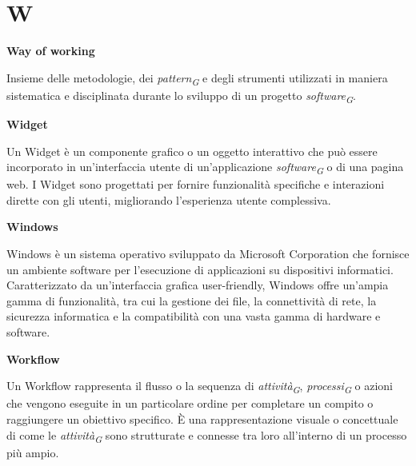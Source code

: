\documentclass{article}
\begin{document}
\pagebreak
\section*{W}
{}

\vspace{0.4cm}

\textbf{Way of working}

\vspace{0.1cm}

Insieme delle metodologie, dei \textit{pattern}\textsubscript{\textit{G}} e degli strumenti utilizzati in maniera sistematica e disciplinata durante lo sviluppo di un progetto \textit{software}\textsubscript{\textit{G}}.

\vspace{0.4cm}

\textbf{Widget}

\vspace{0.1cm}

Un Widget è un componente grafico o un oggetto interattivo che può essere incorporato in un'interfaccia utente di un'applicazione \textit{software}\textsubscript{\textit{G}} o di una pagina web. I Widget sono progettati per fornire funzionalità specifiche e interazioni dirette con gli utenti, migliorando l'esperienza utente complessiva.

\vspace{0.4cm}

\textbf{Windows}

\vspace{0.1cm}

Windows è un sistema operativo sviluppato da Microsoft Corporation che fornisce un ambiente software per l'esecuzione di applicazioni su dispositivi informatici. Caratterizzato da un'interfaccia grafica user-friendly, Windows offre un'ampia gamma di funzionalità, tra cui la gestione dei file, la connettività di rete, la sicurezza informatica e la compatibilità con una vasta gamma di hardware e software.

\vspace{0.4cm}

\textbf{Workflow}

\vspace{0.1cm}

Un Workflow rappresenta il flusso o la sequenza di \textit{attività}\textsubscript{\textit{G}}, \textit{processi}\textsubscript{\textit{G}} o azioni che vengono eseguite in un particolare ordine per completare un compito o raggiungere un obiettivo specifico. È una rappresentazione visuale o concettuale di come le \textit{attività}\textsubscript{\textit{G}} sono strutturate e connesse tra loro all'interno di un processo più ampio.
\end{document}
